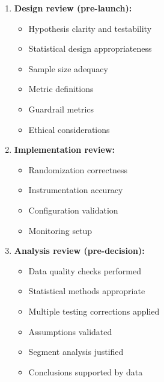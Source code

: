 \begin{enumerate}
    \item \textbf{Design review (pre-launch):}
    \begin{itemize}
        \item Hypothesis clarity and testability
        \item Statistical design appropriateness
        \item Sample size adequacy
        \item Metric definitions
        \item Guardrail metrics
        \item Ethical considerations
    \end{itemize}

    \item \textbf{Implementation review:}
    \begin{itemize}
        \item Randomization correctness
        \item Instrumentation accuracy
        \item Configuration validation
        \item Monitoring setup
    \end{itemize}

    \item \textbf{Analysis review (pre-decision):}
    \begin{itemize}
        \item Data quality checks performed
        \item Statistical methods appropriate
        \item Multiple testing corrections applied
        \item Assumptions validated
        \item Segment analysis justified
        \item Conclusions supported by data
    \end{itemize}
\end{enumerate}


